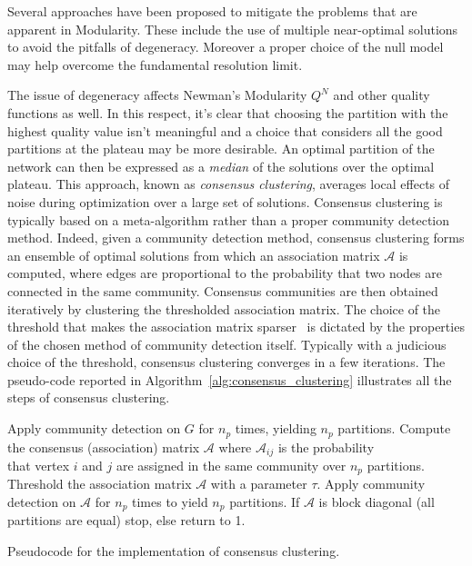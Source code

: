 Several approaches have been proposed to mitigate the problems that are apparent in Modularity. These include the use of multiple near-optimal solutions to avoid the pitfalls of degeneracy. Moreover a proper choice of the null model may help overcome the fundamental resolution limit.

The issue of degeneracy affects Newman's Modularity $Q^N$ and other quality functions as well.
In this respect, it's clear that choosing the partition with the highest quality value isn't meaningful and a choice that considers all the good partitions at the plateau may be more desirable. 
An optimal partition of the network can then be expressed as a \emph{median} of the solutions over the optimal plateau.
This approach, known as \emph{consensus clustering}, averages local effects of noise during optimization over a large set of solutions.
Consensus clustering is typically based on a meta-algorithm rather than a proper community detection method.
Indeed, given a community detection method, consensus clustering forms an ensemble of optimal solutions from which an association matrix $\mathcal{A}$ is computed, where edges are proportional to the probability that two nodes are connected in the same community. 
Consensus communities are then obtained iteratively by clustering the thresholded association matrix.
The choice of the threshold that makes the association matrix sparser~\cite{lancichinetti2012} is dictated by the properties of the chosen method of community detection itself.
Typically with a judicious choice of the threshold, consensus clustering converges in a few iterations.
The pseudo-code reported in Algorithm~\ref{alg:consensus_clustering} illustrates all the steps of consensus clustering.

\begin{Algorithm}[htb!]
\begin{codebox}
\li Apply community detection on $G$ for $n_p$ times, yielding $n_p$ partitions.
\li Compute the consensus (association) matrix $\mathcal{A}$ where $\mathcal{A}_{ij}$ is the probability \\that vertex $i$ and $j$ are assigned in the same community over $n_p$ partitions.
\li Threshold the association matrix $\mathcal{A}$ with a parameter $\tau$.
\li Apply community detection on $\mathcal{A}$ for $n_p$ times to yield $n_p$ partitions.
\li If $\mathcal{A}$ is block diagonal (all partitions are equal) stop, else return to 1.
\end{codebox}
\caption{Pseudocode for the implementation of consensus clustering.}
\label{alg:consensus_clustering}
\end{Algorithm}

